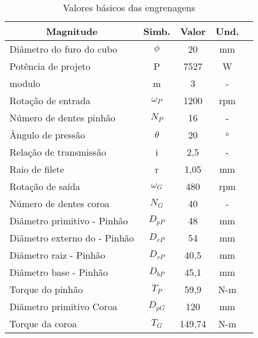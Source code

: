 \begin{table}[!htb]
    \centering
\caption{{\label{tab:3} Valores básicos das engrenagens}}
\begin{tabular}{l c c c c}
\hline
\multicolumn{1}{c}{\textbf{Magnitude}}  & \textbf{Simb.}   & \textbf{Valor}  & \textbf{Und.}  \\ \hline
Diâmetro do furo do cubo                & $\phi$           & 20              & mm             \\
Potência de projeto                     & P                & 7527            & W              \\
modulo                                  & m                & 3               & -              \\
Rotação de entrada                      & $\omega_P$       & 1200            & rpm            \\
Número de dentes pinhão                 & $N_P$            & 16              & -              \\
Ângulo de pressão                       & $\theta$         & 20              & $\circ$        \\
Relação de transmissão                  & i                & 2,5             & -              \\
Raio de filete                          & r                & 1,05            & mm             \\
Rotação de saída                        & $\omega_G$       & 480             & rpm            \\
Número de dentes coroa                  & $N_G$            & 40              & -              \\
Diâmetro primitivo - Pinhão             & $D_{pP}$         & 48              & mm             \\
Diâmetro externo do - Pinhão            & $D_{eP}$         & 54              & mm             \\
Diâmetro raiz - Pinhão                  & $D_{rP}$         & 40,5            & mm             \\
Diâmetro base - Pinhão                  & $D_{bP}$         & 45,1            & mm             \\
Torque do pinhão                        & $T_P$            & 59,9            & N-m            \\
Diâmetro primitivo Coroa                & $D_{pG}$         & 120             & mm             \\
Torque da coroa                         & $T_G$            & 149,74          & N-m            \\

\end{tabular}
\end{table}
